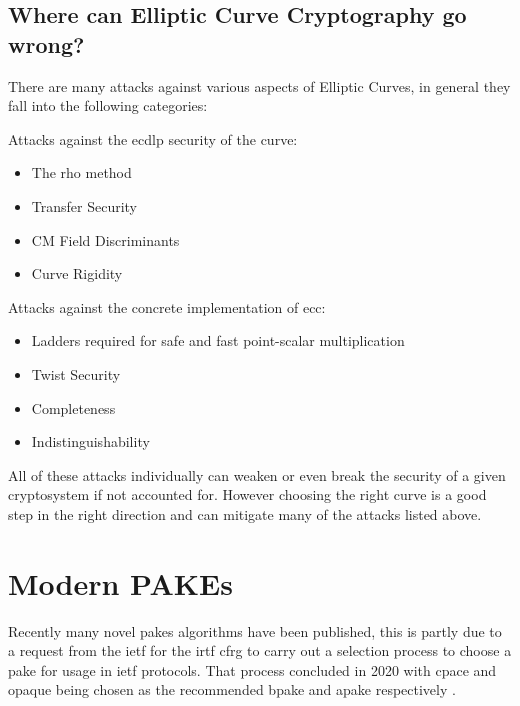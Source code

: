 \subsection{Where can Elliptic Curve Cryptography go wrong?}
There are many attacks against various aspects of Elliptic Curves, in general they fall into the following categories:
\begin{itemize}
  \begin{item}
    Attacks against the \gls{ecdlp} security of the curve:
    \begin{itemize}
      \item{The rho method \cite{pollard-rho}}
      \item{Transfer Security \cite{multiplicative-transfer-attack,additive-transfer-attack}}
      \item{CM Field Discriminants \cite{safecurves}}
      \item{Curve Rigidity \cite{curve-rigidity}}
    \end{itemize}
  \end{item}
  \begin{item}
    Attacks against the concrete implementation of \gls{ecc}:
    \begin{itemize}
      \item{Ladders required for safe and fast point-scalar multiplication \cite{safecurves}}
      \item{Twist Security \cite{small-subgroup-attack,invalid-curve-attack}}
      \item{Completeness \cite{completeness-attack}}
      \item{Indistinguishability \cite{elligator2}}
    \end{itemize}
  \end{item}
\end{itemize}

All of these attacks individually can weaken or even break the security of a given cryptosystem if not accounted for.
However choosing the right curve is a good step in the right direction and can mitigate many of the attacks listed above.

\section{Modern PAKEs}
Recently many novel \glspl{pake} algorithms have been published, this is partly due to a request from the \gls{ietf} for the \gls{irtf} \gls{cfrg} to carry out a selection process to choose a \gls{pake} for usage in \gls{ietf} protocols.
That process concluded in 2020 with \gls{cpace} and \gls{opaque} being chosen as the recommended \gls{bpake} and \gls{apake} respectively \cite{cfrg-pake-selection-results}.

